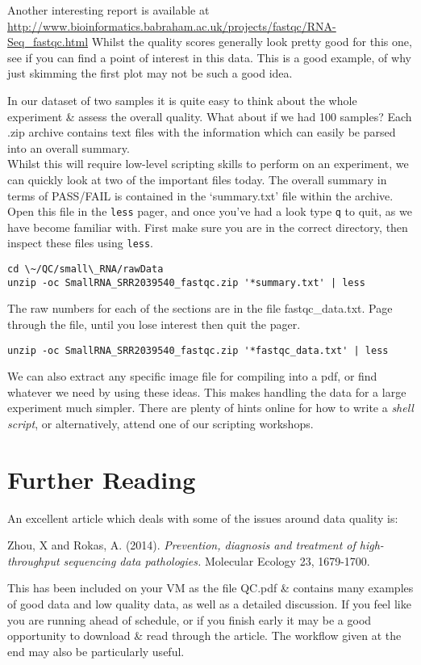 \begin{bonus}
Another interesting report is available at \url{http://www.bioinformatics.babraham.ac.uk/projects/fastqc/RNA-Seq\_fastqc.html}
Whilst the quality scores generally look pretty good for this one, see if you can find a point of interest in this data.
This is a good example, of why just skimming the first plot may not be such a good idea.
\end{bonus}

\begin{advanced}
In our dataset of two samples it is quite easy to think about the whole experiment \& assess the overall quality.
What about if we had 100 samples?
Each .zip archive contains text files with the information which can easily be parsed into an overall summary. \\

Whilst this will require low-level scripting skills to perform on an experiment, we can quickly look at two of the important files today.
The overall summary in terms of PASS/FAIL is contained in the `summary.txt' file within the archive.
Open this file in the \texttt{less} pager, and once you've had a look type \texttt{q} to quit, as we have become familiar with.
First make sure you are in the correct directory, then inspect these files using \texttt{less}.
\begin{lstlisting}
cd \~/QC/small\_RNA/rawData
unzip -oc SmallRNA_SRR2039540_fastqc.zip '*summary.txt' | less
\end{lstlisting}

The raw numbers for each of the sections are in the file fastqc\_data.txt.
Page through the file, until you lose interest then quit the pager.
\begin{lstlisting}
unzip -oc SmallRNA_SRR2039540_fastqc.zip '*fastqc_data.txt' | less
\end{lstlisting}

We can also extract any specific image file for compiling into a pdf, or find whatever we need by using these ideas.
This makes handling the data for a large experiment much simpler.
There are plenty of hints online for how to write a \textit{shell script}, or alternatively, attend one of our scripting workshops.
\end{advanced}

\section{Further Reading}
An excellent article which deals with some of the issues around data quality is:

Zhou, X and Rokas, A. (2014). \textit{Prevention, diagnosis and treatment of high-throughput sequencing data pathologies.} Molecular Ecology 23, 1679-1700.

This has been included on your VM as the file QC.pdf \& contains many examples of good data and low quality data, as well as a detailed discussion.
If you feel like you are running ahead of schedule, or if you finish early it may be a good opportunity to download \& read through the article.
The workflow given at the end may also be particularly useful.
